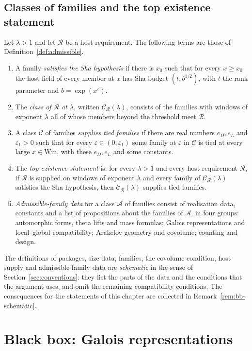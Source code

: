 \documentclass[11pt]{amsbook}
\theoremstyle{plain}
\theoremstyle{definition}
\theoremstyle{remark}
\numberwithin{equation}{section}
\numberwithin{figure}{chapter}
\numberwithin{table}{chapter}
\newcommand{\eps}{\varepsilon}
\newcommand{\Win}{\mathrm{Win}}
\begin{document}
\subsection*{Classes of families and the top existence statement}

Let $\lambda>1$ and let $\mathscr R$ be a host requirement. The
following terms are those of Definition~\ref{def:admissible}.
\begin{enumerate}[label=(\arabic*)]
\item A family \emph{satisfies the Sha hypothesis} if there is $x_0$
such that for every $x\ge x_0$ the host field of every member at $x$
has Sha budget $(t,b^{1/2})$, with $t$ the rank parameter and
$b=\exp(x^\eps)$.
\item The \emph{class of $\mathscr R$ at $\lambda$}, written
$\mathcal C_{\mathscr R}(\lambda)$, consists of the families with
windows of exponent $\lambda$ all of whose members beyond the
threshold meet $\mathscr R$.
\item A class $\mathcal C$ of families \emph{supplies tied families}
if there are real numbers $e_D,e_L$ and $\eps_1>0$ such that for
every $\eps\in(0,\eps_1)$ some family at $\eps$ in $\mathcal C$ is
tied at every large $x\in\Win$, with these $e_D,e_L$ and some
constants.
\item The \emph{top existence statement} is: for every $\lambda>1$
and every host requirement $\mathscr R$, if $\mathscr R$ is supplied
on windows of exponent $\lambda$ and every family of
$\mathcal C_{\mathscr R}(\lambda)$ satisfies the Sha hypothesis, then
$\mathcal C_{\mathscr R}(\lambda)$ supplies tied families.
\item \emph{Admissible-family data} for a class $\mathcal A$ of
families consist of realisation data, constants and a list of
propositions about the families of $\mathcal A$, in four groups:
automorphic forms, theta lifts and mass formulas; Galois
representations and local--global compatibility; Arakelov geometry
and covolume; counting and design.
\end{enumerate}
The definitions of packages, size data, families, the covolume
condition, host supply and admissible-family data are
\emph{schematic} in the sense of Section~\ref{sec:conventions}: they
list the parts of the data and the conditions that the argument
uses, and omit the remaining compatibility conditions. The
consequences for the statements of this chapter are collected in
Remark~\ref{rem:bb-schematic}.

\section{Black box: Galois representations}
\label{sec:bb-galois}
\end{document}
